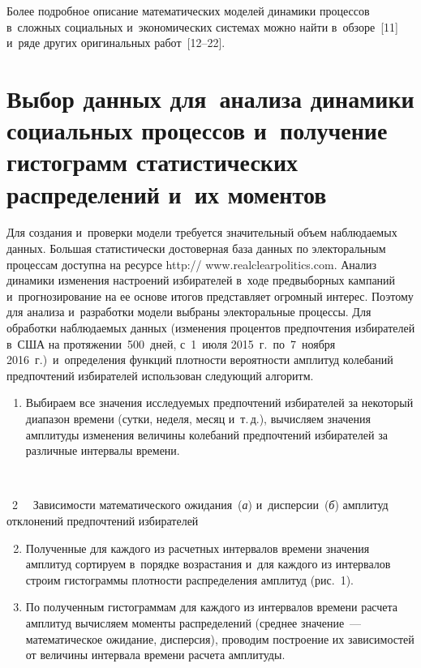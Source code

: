 \begin{multicols}{2}
    Более подробное описание математических моделей динамики процессов 
в~сложных социальных и~экономических системах можно найти в~обзоре~[11] 
и~ряде других оригинальных работ~[12--22].



\section{Выбор данных для~анализа динамики социальных 
процессов и~получение гистограмм статистических распределений 
и~их моментов}

    Для создания и~проверки модели требуется значительный объем 
наблюдаемых данных. Большая статистически достоверная база данных по 
электоральным процессам доступна на ресурсе {\sf 
http:// www.realclearpolitics.com}. Анализ динамики изменения настроений 
избирателей в~ходе предвыборных кампаний и~прогнозирование на ее основе 
итогов представляет огромный интерес. Поэтому для анализа и~разработки 
модели выбраны электоральные процессы. Для обработки наблюдаемых 
данных (изменения процентов предпочтения избирателей в~США на 
протяжении~500~дней, с~1~июля 2015~г.\ по~7~ноября 2016~г.)\ 
и~определения функций плотности вероятности амплитуд колебаний 
предпочтений избирателей использован следующий алгоритм. 
    \begin{enumerate}[1.]
    \item Выбираем все значения исследуемых предпочтений избирателей за 
некоторый диапазон времени (сутки, неделя, месяц и~т.\,д.), вычисляем 
значения амплитуды изменения величины колебаний предпочтений 
избирателей за различные интервалы времени. 
\end{enumerate}

{ \begin{center}  %
 \vspace*{-2pt}
   \mbox{%
 \epsfxsize=78.898mm 
 }

\end{center}

\noindent
{{\figurename~2}\ \ \small{
Зависимости математического ожидания~(\textit{а}) 
и~дисперсии~(\textit{б}) амплитуд отклонений предпочтений избирателей
}}}

\vspace*{9pt}

\setcounter{figure}{2}

 

\begin{enumerate}[1.]
\setcounter{enumi}{1}
    \item Полученные для каждого из расчетных интервалов времени 
значения амплитуд сортируем в~порядке возрастания и~для каждого из 
интервалов строим гистограммы плотности распределения амплитуд (рис.~1).
    \item По полученным гистограммам для каждого из интервалов времени 
расчета амплитуд вы\-чис\-ля\-ем моменты распределений (среднее значение~--- 
математическое ожидание, дисперсия), проводим построение их зависимостей 
от величины интервала времени расчета амплитуды. 
    \end{enumerate}
    

\end{multicols}
